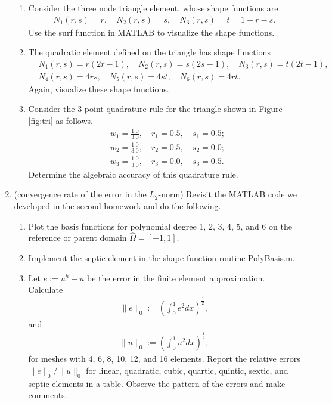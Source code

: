 \documentclass[12pt]{article}
\begin{document}
\begin{enumerate}
\begin{enumerate}
\item Consider the three node triangle element, whose shape functions are 
\begin{align*}
N_1(r,s) = r, \quad N_2(r,s) = s, \quad N_3(r,s) = t = 1 - r - s.
\end{align*}
Use the surf function in MATLAB to visualize the shape functions.

\item The quadratic element defined on the triangle has shape functions
\begin{align*}
& N_1(r,s) = r(2r-1), \quad N_2(r,s) = s(2s-1), \quad N_3(r,s) = t(2t-1), \\
& N_4(r,s) = 4rs, \quad N_5(r,s) = 4st, \quad N_6(r,s) = 4rt.
\end{align*}
Again, visualize these shape functions.

\item Consider the 3-point quadrature rule for the triangle shown in Figure \ref{fig:tri} as follows.
\begin{align*}
&w_1 = \frac{1.0}{3.0}, \quad r_1 = 0.5, \quad s_1 = 0.5; \\
&w_2= \frac{1.0}{3.0}, \quad r_2 = 0.5, \quad s_2 = 0.0;\\
&w_3 = \frac{1.0}{3.0}, \quad r_3 = 0.0, \quad s_3 = 0.5.
\end{align*}
Determine the algebraic accuracy of this quadrature rule.
\end{enumerate}



\item (convergence rate of the error in the $L_2$-norm) Revisit the MATLAB code we developed in the second homework and do the following.
\begin{enumerate}
\item Plot the basis functions for polynomial degree 1, 2, 3, 4, 5, and 6 on the reference or parent domain $\hat{\Omega}=[-1,1]$.
\item Implement the septic element in the shape function routine PolyBasis.m.
\item Let $e:=u^h - u$ be the error in the finite element approximation. Calculate
\begin{align*}
\|e\|_0 := \left( \int_0^1  e^2 dx \right)^{\frac12},
\end{align*}
and 
\begin{align*}
\|u\|_0 := \left( \int_0^1  u^2 dx \right)^{\frac12},
\end{align*}
for meshes with 4, 6, 8, 10, 12, and 16 elements. Report the relative errors $\|e\|_0/\|u\|_0$ for linear, quadratic, cubic, quartic, quintic, sextic, and septic elements in a table. Observe the pattern of the errors and make comments.
\end{enumerate}
\end{enumerate}
\end{document}
